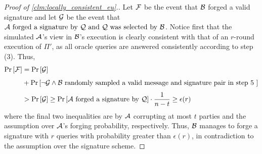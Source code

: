 \begin{proof}[Proof of \cref{clm:locally_consistent_eu}.]
Let $\mathcal{F}$ be the event that $\mathcal{B}$ forged a valid signature and let $\mathcal{G}$ be the event that $\mathcal{A} \text{ forged a signature by } \mathcal{Q} \text{ and } \mathcal{Q} \text{ was selected by } \mathcal{B}$. Notice first that the simulated $\mathcal{A}$'s view in $\mathcal{B}$'s execution is clearly consistent with that of an $r$-round execution of $\Pi'$, as all oracle queries are answered consistently according to step (3). Thus,
\begin{align*}
\Pr_{}\left[\mathcal{F}\right] &= \Pr_{}\left[\mathcal{G}\right]\\&+ \Pr_{}\left[\neg \mathcal{G} \land \mathcal{B} \text{ randomly sampled a valid message and signature pair in step 5 }\right]\\
&>\Pr_{}\left[\mathcal{G}\right] \ge \Pr_{}\left[\mathcal{A} \text{ forged a signature by } \mathcal{Q}\right] \cdot \frac{1}{n-t} \ge \epsilon(r)
\end{align*}
where the final two inequalities are by $\mathcal{A}$ corrupting at most $t$ parties and the assumption over $\mathcal{A}$'s forging probability, respectively. Thus, $\mathcal{B}$ manages to forge a signature with $r$ queries with probability greater than $\epsilon(r)$, in contradiction to the assumption over the signature scheme.
\end{proof}

